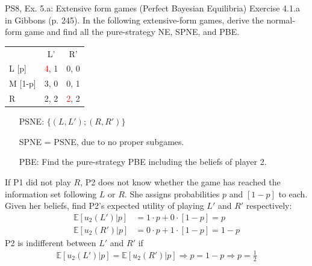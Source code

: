 \begin{frame}{PS8, Ex. 5.a: Extensive form games (Perfect Bayesian Equilibria)}
    Exercise 4.1.a in Gibbons (p. 245). In the following extensive-form games, derive the normal-form game and find all the pure-strategy NE, SPNE, and PBE.
    \vspace{-8pt}
    \begin{multicols}{2}
      \begin{table}
        \begin{tabular}{l|c|c|}
          \multicolumn{1}{c}{} & \multicolumn{1}{c}{L'} & \multicolumn{1}{c}{R'} \\\cline{2-3}
          L [p]   & \textcolor{red}{4}, \color{blue}1 & 0, 0 \\\cline{2-3}
          M [1-p] & 3, 0 & 0, \color{blue}1 \\\cline{2-3}
          R       & 2, \color{blue}2 & \textcolor{red}{2}, \color{blue}2 \\\cline{2-3}
        \end{tabular}
      \end{table} \vspace{-6pt}
      \begin{itemize}
        \item[PSNE:] $\{(L,L');(R,R')\}$
        \item[SPNE =] PSNE, due to no proper subgames.
        \item[PBE:] Find the pure-strategy PBE including the beliefs of player 2.
      \end{itemize} \vspace{-4pt}
      If P1 did not play $R$, P2 does not know whether the game has reached the information set following $L$ or $R$. She assigns probabilities $p$ and $[1-p]$ to each.\\\smallskip
      Given her beliefs, find P2's expected utility of playing $L'$ and $R'$ respectively: \vspace{-4pt}
      \begin{align*}
        \mathbb{E}[u_2(L')|p]&=1\cdot p+0\cdot[1-p]=p\\
        \mathbb{E}[u_2(R')|p]&=0\cdot p+1\cdot[1-p]=1-p
      \end{align*}
      P2 is indifferent between $L'$ and $R'$ if \vspace{-4pt}
      \begin{align*}
        \mathbb{E}[u_2(L')|p]=\mathbb{E}[u_2(R')|p]\Rightarrow p=1-p\Rightarrow p=\frac{1}{2}
      \end{align*}

\end{multicols}
\end{frame}
